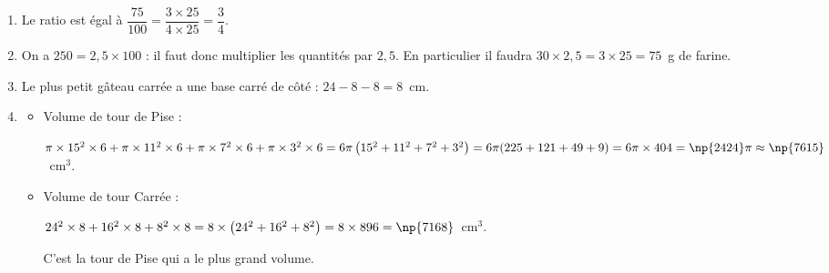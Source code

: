 \begin{enumerate}
\item %
Le ratio est égal à $\dfrac{75}{100} = \dfrac{3 \times 25}{4 \times 25} = \dfrac{3}{4}$.
\item  %
On a $250 = 2,5 \times 100$ : il faut donc multiplier les quantités par $2,5$. En particulier il faudra $30 \times 2,5 = 3 \times 25 = 75$~g de farine.
\item %
Le plus petit gâteau carrée a une base carré de côté : $24 - 8 - 8 = 8$~cm.
\item  %
\begin{itemize}
\item Volume de tour de Pise :

$\pi \times 15^2 \times 6 + \pi \times 11^2 \times 6 + \pi \times 7^2 \times 6 + \pi \times 3^2 \times 6 = 6\pi\left(15^2  + 11^2 + 7^2 + 3^2\right) = 6\pi(225 + 121 + 49 + 9) = 6\pi \times 404 = \np{2424}\pi \approx \np{7615}$~cm$^3$.
\item Volume de tour Carrée :

$24^2\times 8 + 16^2 \times 8 + 8^2\times 8  = 8\times\left(24^2 + 16^2 + 8^2 \right) = 8 \times 896 = \np{7168}$~cm$^3$.

C'est la tour de Pise qui a le plus grand volume.
\end{itemize}

\end{enumerate}

%

\bigskip

